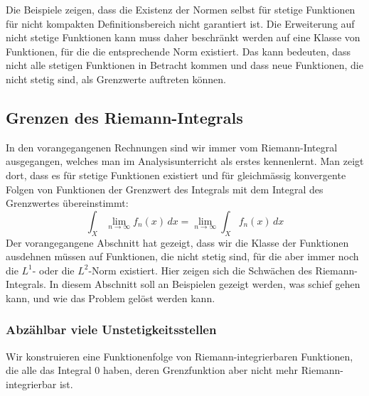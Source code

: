 Die Beispiele zeigen, dass die Existenz der Normen selbst für stetige
Funktionen für nicht kompakten Definitionsbereich nicht garantiert ist.
Die Erweiterung auf nicht stetige Funktionen kann muss daher beschränkt
werden auf eine Klasse von Funktionen, für die die entsprechende Norm
existiert.
Das kann bedeuten, dass nicht alle stetigen Funktionen in Betracht 
kommen und dass neue Funktionen, die nicht stetig sind, als
Grenzwerte auftreten können.

%
%
\subsection{Grenzen des Riemann-Integrals
\label{buch:skalarprodukt:funktionenraeume:subsection:grenzen-riemann}}
In den vorangegangenen Rechnungen sind wir immer vom Riemann-Integral
ausgegangen, welches man im Analysisunterricht als erstes kennenlernt.
Man zeigt dort, dass es für stetige Funktionen existiert und für
gleichmässig konvergente Folgen von Funktionen der Grenzwert des
Integrals mit dem Integral des Grenzwertes übereinstimmt:
\[
\int_X \lim_{n\to\infty} f_n(x)\,dx
=
\lim_{n\to\infty}
\int_X f_n(x)\,dx
\]
Der vorangegangene Abschnitt hat gezeigt, dass wir die Klasse der
Funktionen ausdehnen müssen auf Funktionen, die nicht stetig sind,
für die aber immer noch die $L^1$- oder die $L^2$-Norm existiert.
Hier zeigen sich die Schwächen des Riemann-Integrals.
In diesem Abschnitt soll an Beispielen gezeigt werden, was schief
gehen kann, und wie das Problem gelöst werden kann.

%
%
\subsubsection{Abzählbar viele Unstetigkeitsstellen}
Wir konstruieren eine Funktionenfolge von Riemann-integrierbaren 
Funktionen, die alle das Integral $0$ haben, deren Grenzfunktion
aber nicht mehr Riemann-integrierbar ist.

